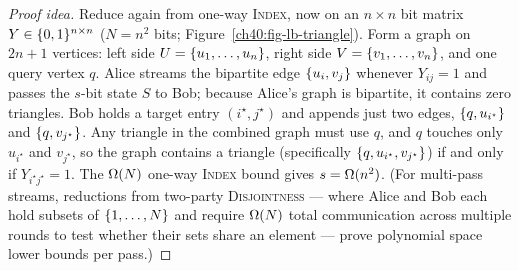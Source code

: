 \begin{proof}[Proof idea]
Reduce again from one-way \textsc{Index}, now on an $n\times n$ bit matrix
$Y\in\{0,1\}^{n\times n}$ ($N=n^2$ bits; Figure~\ref{ch40:fig-lb-triangle}).
Form a graph on $2n+1$ vertices: left side $U=\{u_1,\dots,u_n\}$, right side
$V=\{v_1,\dots,v_n\}$, and one query vertex $q$. Alice streams the bipartite
edge $\{u_i,v_j\}$ whenever $Y_{ij}=1$ and passes the $s$-bit state $S$ to
Bob; because Alice's graph is bipartite, it contains zero triangles. Bob holds a
target entry $(i^\star,j^\star)$ and appends just two edges, $\{q,u_{i^\star}\}$
and $\{q,v_{j^\star}\}$. Any triangle in the combined graph must use $q$, and
$q$ touches only $u_{i^\star}$ and $v_{j^\star}$, so the graph contains a
triangle (specifically $\{q,u_{i^\star},v_{j^\star}\}$) if and only if
$Y_{i^\star j^\star}=1$. The $\Omega(N)$ one-way \textsc{Index} bound gives
$s=\Omega(n^2)$. (For multi-pass streams, reductions from two-party
\textsc{Disjointness} --- where Alice and Bob each hold subsets of $\{1,\dots,N\}$
and require $\Omega(N)$ total communication across multiple rounds to test whether
their sets share an element --- prove polynomial space lower bounds per pass.)
\end{proof}


